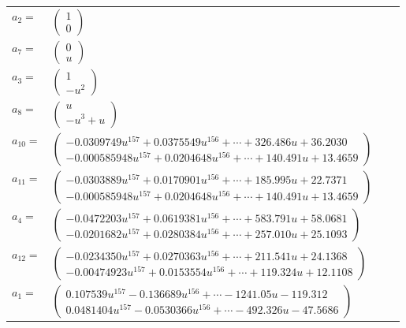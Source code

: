 \documentclass[1p]{elsarticle_modified}
\theoremstyle{definition}
\begin{document}
\begin{tabular}{m{7pt} m{180pt} m{7pt} m{180pt} }
\flushright $a_{2}=$&$\begin{pmatrix}1\\0\end{pmatrix}$ \\
\flushright $a_{7}=$&$\begin{pmatrix}0\\u\end{pmatrix}$ \\
\flushright $a_{3}=$&$\begin{pmatrix}1\\- u^2\end{pmatrix}$ \\
\flushright $a_{8}=$&$\begin{pmatrix}u\\- u^3+u\end{pmatrix}$ \\
\flushright $a_{10}=$&$\begin{pmatrix}-0.0309749 u^{157}+0.0375549 u^{156}+\cdots+326.486 u+36.2030\\-0.000585948 u^{157}+0.0204648 u^{156}+\cdots+140.491 u+13.4659\end{pmatrix}$ \\
\flushright $a_{11}=$&$\begin{pmatrix}-0.0303889 u^{157}+0.0170901 u^{156}+\cdots+185.995 u+22.7371\\-0.000585948 u^{157}+0.0204648 u^{156}+\cdots+140.491 u+13.4659\end{pmatrix}$ \\
\flushright $a_{4}=$&$\begin{pmatrix}-0.0472203 u^{157}+0.0619381 u^{156}+\cdots+583.791 u+58.0681\\-0.0201682 u^{157}+0.0280384 u^{156}+\cdots+257.010 u+25.1093\end{pmatrix}$ \\
\flushright $a_{12}=$&$\begin{pmatrix}-0.0234350 u^{157}+0.0270363 u^{156}+\cdots+211.541 u+24.1368\\-0.00474923 u^{157}+0.0153554 u^{156}+\cdots+119.324 u+12.1108\end{pmatrix}$ \\
\flushright $a_{1}=$&$\begin{pmatrix}0.107539 u^{157}-0.136689 u^{156}+\cdots-1241.05 u-119.312\\0.0481404 u^{157}-0.0530366 u^{156}+\cdots-492.326 u-47.5686\end{pmatrix}$ \\

\end{tabular}
\end{document}
